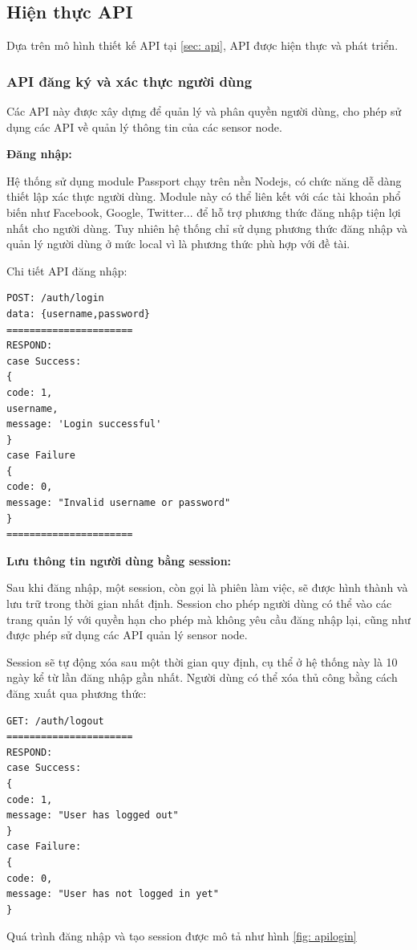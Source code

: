 \subsection{Hiện thực API}
Dựa trên mô hình thiết kế API tại \ref{sec: api}, API được hiện thực và phát triển.


\subsubsection*{API đăng ký và xác thực người dùng}

Các API này được xây dựng để quản lý và phân quyền người dùng, cho phép sử dụng các API về quản lý thông tin của các sensor node.

\textbf{Đăng nhập:}

Hệ thống sử dụng module Passport chạy trên nền Nodejs, có chức năng dễ dàng thiết lập xác thực người dùng. Module này có thể liên kết với các tài khoản phổ biến như Facebook, Google, Twitter... để hỗ trợ phương thức đăng nhập tiện lợi nhất cho người dùng. Tuy nhiên hệ thống chỉ sử dụng phương thức đăng nhập và quản lý người dùng ở mức local vì là phương thức phù hợp với đề tài.

Chi tiết API đăng nhập:
\begin{Verbatim}[xleftmargin=2em]
POST: /auth/login
data: {username,password}
======================
RESPOND:
case Success:
{
code: 1,
username,
message: 'Login successful'
}
case Failure	
{
code: 0,
message: "Invalid username or password"
}
======================
\end{Verbatim}

\textbf{Lưu thông tin người dùng bằng session:}

Sau khi đăng nhập, một session, còn gọi là phiên làm việc, sẽ được hình thành và lưu trữ trong thời gian nhất định. Session cho phép người dùng có thể vào các trang quản lý với quyền hạn cho phép mà không yêu cầu đăng nhập lại, cũng như được phép sử dụng các API quản lý sensor node.

Session sẽ tự động xóa sau một thời gian quy định, cụ thể ở hệ thống này là 10 ngày kể từ lần đăng nhập gần nhất. Người dùng có thể xóa thủ công bằng cách đăng xuất qua phương thức:
\begin{Verbatim}[xleftmargin=2em]
GET: /auth/logout
======================
RESPOND:
case Success:
{
code: 1,
message: "User has logged out"
}
case Failure:	
{
code: 0,
message: "User has not logged in yet"
}	
\end{Verbatim}

Quá trình đăng nhập và tạo session được mô tả như hình \ref{fig: apilogin}

